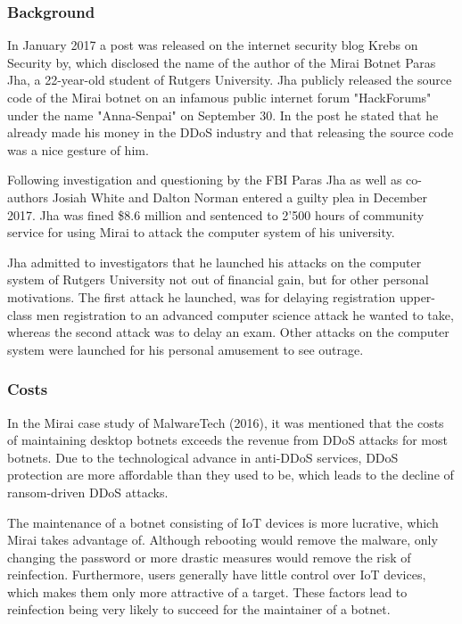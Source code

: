 	\subsubsection{Background}
	In January 2017 a post was released on the internet security blog Krebs on Security by, which disclosed the name of the author of the Mirai Botnet Paras Jha, a 22-year-old student of Rutgers University. Jha publicly released the source code of the Mirai botnet on an infamous public internet forum "HackForums" under the name "Anna-Senpai" on September 30. In the post he stated that he already made his money in the DDoS industry and that releasing the source code was a nice gesture of him. \cite{Krebs17}

Following investigation and questioning by the FBI Paras Jha as well as co-authors Josiah White and Dalton Norman entered a guilty plea in December 2017. \cite{USDepartment17} Jha was fined \$8.6 million and sentenced to 2'500 hours of community service for using Mirai to attack the computer system of his university. \cite{Krebs18}

Jha admitted to investigators that he launched his attacks on the computer system of Rutgers University not out of financial gain, but for other personal motivations. The first attack he launched, was for delaying registration upper-class men registration to an advanced computer science attack he wanted to take, whereas the second attack was to delay an exam. Other attacks on the computer system were launched for his personal amusement to see outrage. \cite{Krebs18}

	\subsubsection{Costs}
	In the Mirai case study of MalwareTech (2016), it was mentioned that the costs of maintaining desktop botnets exceeds the revenue from DDoS attacks for most botnets. Due to the technological advance in anti-DDoS services, DDoS protection are more affordable than they used to be, which leads to the decline of ransom-driven DDoS attacks. \cite{MalwareTech16}
	
The maintenance of a botnet consisting of IoT devices is more lucrative, which Mirai takes advantage of. Although rebooting would remove the malware, only changing the password or more drastic measures would remove the risk of reinfection. Furthermore, users generally have little control over IoT devices, which makes them only more attractive of a target. These factors lead to reinfection being very likely to succeed for the maintainer of a botnet. \cite{MalwareTech16}

